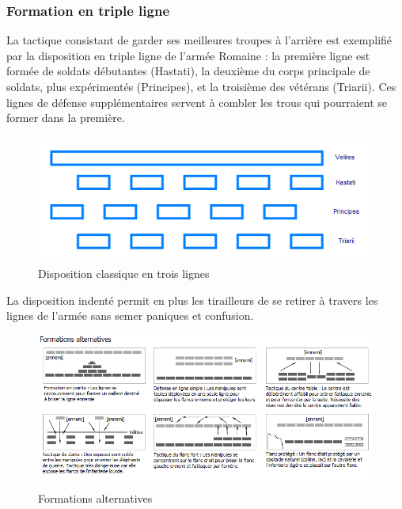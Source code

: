 \documentclass{article}
\begin{document}
\subsubsection{Formation en triple ligne}
La tactique consistant de garder ses meilleures troupes à l'arrière est exemplifié par la disposition en triple ligne de l'armée Romaine : la première ligne est formée de soldats débutantes (Hastati), la deuxième du corps principale de soldats, plus expérimentés (Principes), et la troisième des vétérans (Triarii). Ces lignes de défense supplémentaires servent à combler les trous qui pourraient se former dans la première. 
\begin{figure}[H]
	\begin{centering}
	\includegraphics[width=\linewidth]{../ressources/Polybian_formation}
	\caption{Disposition classique en trois lignes \cite{roman_infantry_tactics}}
	\end{centering}
\end{figure}
La disposition indenté permit en plus les tirailleurs de se retirer à travers les lignes de l'armée sans semer paniques et confusion. 
\begin{figure}[H]
	\begin{centering}
	\includegraphics[width=\linewidth]{../ressources/Formations_infanterie_romaine}
	\caption{Formations alternatives \cite{roman_infantry_tactics}}
	\end{centering}
\end{figure}
\end{document}
